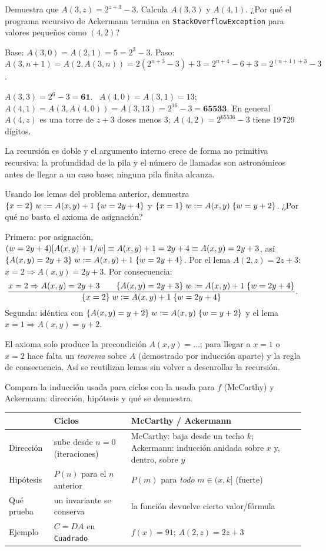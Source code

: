 \begin{prob}
Demuestra que $A(3,z)=2^{z+3}-3$. Calcula $A(3,3)$ y $A(4,1)$. ¿Por qué el programa recursivo de Ackermann termina en \texttt{StackOverflowException} para valores pequeños como $(4,2)$?
\end{prob}
\begin{sol}
Base: $A(3,0)=A(2,1)=5=2^3-3$. Paso: $A(3,n+1)=A(2,A(3,n))=2(2^{n+3}-3)+3=2^{n+4}-6+3=2^{(n+1)+3}-3$. \checkmark

$A(3,3)=2^6-3=\mathbf{61}$. \ $A(4,0)=A(3,1)=13$; \ $A(4,1)=A(3,A(4,0))=A(3,13)=2^{16}-3=\mathbf{65533}$.
En general $A(4,z)$ es una torre de $z+3$ doses menos 3; $A(4,2)=2^{65536}-3$ tiene 19\,729 dígitos.

La recursión es doble y el argumento interno crece de forma no primitiva recursiva: la profundidad de la pila y el número de llamadas son astronómicos antes de llegar a un caso base; ninguna pila finita alcanza.
\end{sol}

\begin{prob}
Usando los lemas del problema anterior, demuestra $\{x=2\}\;w\mathrel{:=} A(x,y)+1\;\{w=2y+4\}$ y $\{x=1\}\;w\mathrel{:=} A(x,y)\;\{w=y+2\}$. ¿Por qué no basta el axioma de asignación?
\end{prob}
\begin{sol}
Primera: por asignación, $(w=2y+4)[A(x,y)+1/w]\equiv A(x,y)+1=2y+4\equiv A(x,y)=2y+3$, así $\{A(x,y)=2y+3\}\;w\mathrel{:=} A(x,y)+1\;\{w=2y+4\}$. Por el lema $A(2,z)=2z+3$: $x=2\Rightarrow A(x,y)=2y+3$. Por consecuencia:
\[\dfrac{x=2\Rightarrow A(x,y)=2y+3\qquad\{A(x,y)=2y+3\}\;w\mathrel{:=} A(x,y)+1\;\{w=2y+4\}}{\{x=2\}\;w\mathrel{:=} A(x,y)+1\;\{w=2y+4\}}.\]
Segunda: idéntica con $\{A(x,y)=y+2\}\;w\mathrel{:=} A(x,y)\;\{w=y+2\}$ y el lema $x=1\Rightarrow A(x,y)=y+2$.

El axioma solo produce la precondición $A(x,y)=\dots$; para llegar a $x=1$ o $x=2$ hace falta un \emph{teorema} sobre $A$ (demostrado por inducción aparte) y la regla de consecuencia. Así se reutilizan lemas sin volver a desenrollar la recursión.
\end{sol}

\begin{prob}
Compara la inducción usada para ciclos con la usada para $f$ (McCarthy) y Ackermann: dirección, hipótesis y qué se demuestra.
\end{prob}
\begin{sol}
\begin{tabular}{@{}p{3cm}p{5.5cm}p{6.3cm}@{}}
\toprule & Ciclos & McCarthy / Ackermann\\\midrule
Dirección & sube desde $n=0$ (iteraciones) & McCarthy: baja desde un techo $k$; Ackermann: inducción anidada sobre $x$ y, dentro, sobre $y$\\
Hipótesis & $P(n)$ para el $n$ anterior & $P(m)$ para \emph{todo} $m\in(x,k]$ (fuerte)\\
Qué prueba & un invariante se conserva & la función devuelve cierto valor/fórmula\\
Ejemplo & $C=DA$ en \texttt{Cuadrado} & $f(x)=91$; $A(2,z)=2z+3$\\\bottomrule
\end{tabular}
\end{sol}

